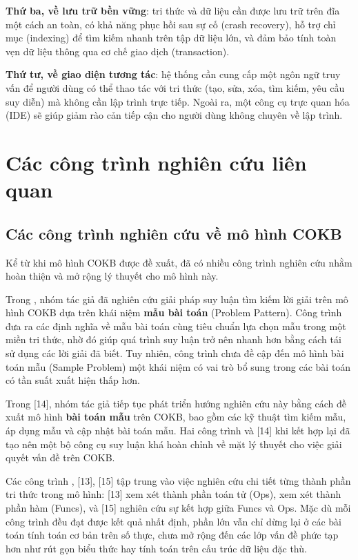 \documentclass[13pt,a4paper,oneside]{extreport}
\begin{document}
\textbf{Thứ ba, về lưu trữ bền vững}: tri thức và dữ liệu cần được lưu trữ trên đĩa một cách an toàn, có khả năng phục hồi sau sự cố (crash recovery), hỗ trợ chỉ mục (indexing) để tìm kiếm nhanh trên tập dữ liệu lớn, và đảm bảo tính toàn vẹn dữ liệu thông qua cơ chế giao dịch (transaction).


\textbf{Thứ tư, về giao diện tương tác}: hệ thống cần cung cấp một ngôn ngữ truy vấn để người dùng có thể thao tác với tri thức (tạo, sửa, xóa, tìm kiếm, yêu cầu suy diễn) mà không cần lập trình trực tiếp. Ngoài ra, một công cụ trực quan hóa (IDE) sẽ giúp giảm rào cản tiếp cận cho người dùng không chuyên về lập trình.


\section{Các công trình nghiên cứu liên quan}


\subsection{Các công trình nghiên cứu về mô hình COKB}


Kể từ khi mô hình COKB được đề xuất, đã có nhiều công trình nghiên cứu nhằm hoàn thiện và mở rộng lý thuyết cho mô hình này.


Trong \cite{Dvn_Somet}, nhóm tác giả đã nghiên cứu giải pháp suy luận tìm kiếm lời giải trên mô hình COKB dựa trên khái niệm \textbf{mẫu bài toán} (Problem Pattern). Công trình đưa ra các định nghĩa về mẫu bài toán cùng tiêu chuẩn lựa chọn mẫu trong một miền tri thức, nhờ đó giúp quá trình suy luận trở nên nhanh hơn bằng cách tái sử dụng các lời giải đã biết. Tuy nhiên, công trình chưa đề cập đến mô hình bài toán mẫu (Sample Problem)  một khái niệm có vai trò bổ sung trong các bài toán có tần suất xuất hiện thấp hơn.


Trong [14], nhóm tác giả tiếp tục phát triển hướng nghiên cứu này bằng cách đề xuất mô hình \textbf{bài toán mẫu} trên COKB, bao gồm các kỹ thuật tìm kiếm mẫu, áp dụng mẫu và cập nhật bài toán mẫu. Hai công trình \cite{Dvn_Somet} và [14] khi kết hợp lại đã tạo nên một bộ công cụ suy luận khá hoàn chỉnh về mặt lý thuyết cho việc giải quyết vấn đề trên COKB.


Các công trình \cite{DoVanNhon1}, [13], [15] tập trung vào việc nghiên cứu chi tiết từng thành phần tri thức trong mô hình: [13] xem xét thành phần toán tử (Ops), \cite{DoVanNhon1} xem xét thành phần hàm (Funcs), và [15] nghiên cứu sự kết hợp giữa Funcs và Ops. Mặc dù mỗi công trình đều đạt được kết quả nhất định, phần lớn vẫn chỉ dừng lại ở các bài toán tính toán cơ bản trên số thực, chưa mở rộng đến các lớp vấn đề phức tạp hơn như rút gọn biểu thức hay tính toán trên cấu trúc dữ liệu đặc thù.
\end{document}
